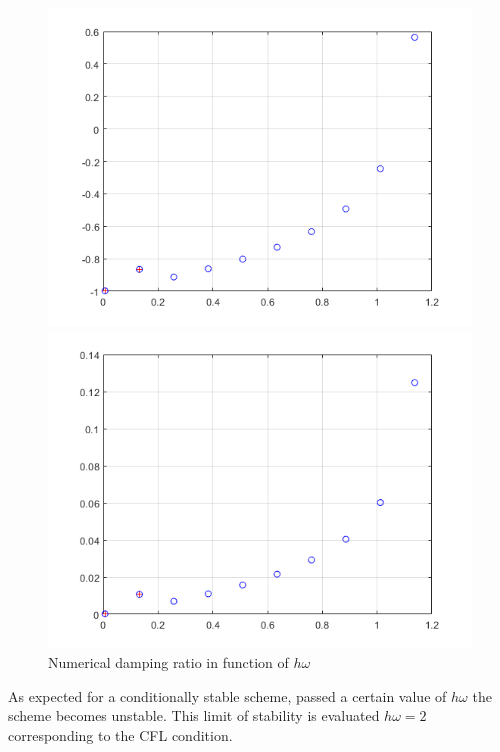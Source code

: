 \begin{figure}[H]
\begin{minipage}[b]{0.475\textwidth}
    \centering 
    \includegraphics[width=\textwidth]{images/pml_exp_per.png}
    \caption[]%
    {{\small relative periodicity error in function of $h\omega$}}    
    \label{fig:med_relat_per}
\end{minipage}
\quad
\begin{minipage}[b]{0.475\textwidth}   
    \centering 
    \includegraphics[width=\textwidth]{images/pml_expl_damp.png}
    \caption[]%
    {{\small Numerical damping ratio in function of $h\omega$}}    
    \label{fig:med_damp}
\end{minipage}
\end{figure}
As expected for a conditionally stable scheme, passed a certain value of $h \omega$ the scheme becomes unstable. This limit of stability is evaluated $h \omega = 2$ corresponding to the CFL condition.\\
